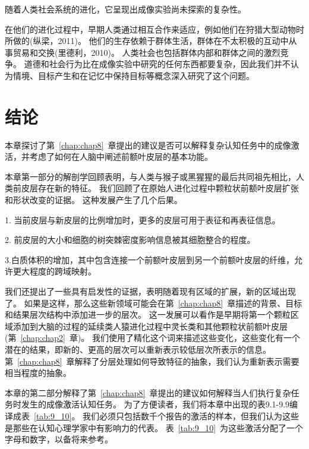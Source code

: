 随着人类社会系统的进化，它呈现出成像实验尚未探索的复杂性。


在他们的进化过程中，早期人类通过相互合作来适应，例如他们在狩猎大型动物时所做的(纵梁，2011)。
他们的生存依赖于群体生活，群体在不太积极的互动中从事贸易和交换(里德利，2010)。
人类社会也包括群体内部和群体之间的激烈竞争。
道德和社会行为比在成像实验中研究的任何东西都要复杂，因此我们并不认为情境、目标产生和在记忆中保持目标等概念深入研究了这个问题。



\section{结论}

本章探讨了第~\ref{chap:chap8}~章提出的建议是否可以解释复杂认知任务中的成像激活，并考虑了如何在人脑中阐述前额叶皮层的基本功能。


本章第一部分的解剖学回顾表明，与人类与猴子或黑猩猩的最后共同祖先相比，人类前皮层存在新的特征。
我们回顾了在原始人进化过程中颗粒状前额叶皮层扩张和形状改变的证据。
这种发展产生了几个后果。


1. 当前皮层与新皮层的比例增加时，更多的皮层可用于表征和再表征信息。


2. 前皮层的大小和细胞的树突棘密度影响信息被其细胞整合的程度。


3.白质体积的增加，其中包含连接一个前额叶皮层到另一个前额叶皮层的纤维，允许更大程度的跨域映射。


我们还提出了一些具有启发性的证据，表明随着现有区域的扩展，新的区域出现了。
如果是这样，那么这些新领域可能会在第~\ref{chap:chap8}~章描述的背景、目标和结果层次结构中添加进一步的层次。
这一发展可以看作是早期将第一个颗粒区域添加到大脑的过程的延续类人猿进化过程中灵长类和其他颗粒状前额叶皮层(第~\ref{chap:chap2}~章)。
我们使用了精化这个词来描述这些变化，这些变化有一个潜在的结果，即新的、更高的层次可以重新表示较低层次所表示的信息。
第~\ref{chap:chap8}~章解释了分层处理如何导致特征的抽象，我们认为重新表示需要相当程度的抽象。


本章的第二部分解释了第~\ref{chap:chap8}~章提出的建议如何解释当人们执行复杂任务时发生的成像激活认知任务。
为了方便读者，我们将本章中出现的表9.1-9.9编译成表~\ref{tab:9_10}。
我们必须只包括数千个报告的激活的样本，但我们认为这些是那些在认知心理学家中有影响力的代表。
表~\ref{tab:9_10}~为这些激活分配了一个字母和数字，以备将来参考。


